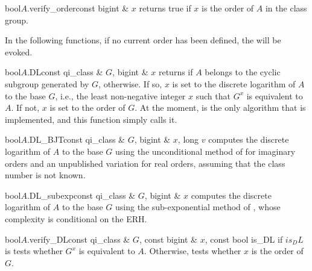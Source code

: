 \begin{cfcode}{bool}{$A$.verify_order}{const bigint & $x$}
  returns true if $x$ is the order of $A$ in the class group.
\end{cfcode}




In the following functions, if no current order has been defined, the \LEH will be evoked.

\begin{cfcode}{bool}{$A$.DL}{const qi_class & $G$, bigint & $x$}
  returns \TRUE if $A$ belongs to the cyclic subgroup generated by $G$, \FALSE otherwise.  If
  so, $x$ is set to the discrete logarithm of $A$ to the base $G$, i.e., the least non-negative
  integer $x$ such that $G^x$ is equivalent to $A$.  If not, $x$ is set to the order of $G$.  At
  the moment,  is the only algorithm that is implemented, and this function simply
  calls it.
\end{cfcode}

\begin{cfcode}{bool}{$A$.DL_BJT}{const qi_class & $G$, bigint & $x$, long $v$}
  computes the discrete logarithm of $A$ to the base $G$ using the unconditional method of
  \cite{Buchmann/Jabobson/Teske:1997} for imaginary orders and an unpublished variation for real
  orders, assuming that the class number is not known.
\end{cfcode}


\begin{cfcode}{bool}{$A$.DL_subexp}{const qi_class & $G$, bigint & $x$}
  computes the discrete logarithm of $A$ to the base $G$ using the sub-exponential method of
  \cite{Jacobson_Thesis:1999}, whose complexity is conditional on the ERH.
\end{cfcode}

\begin{cfcode}{bool}{$A$.verify_DL}{const qi_class & $G$, const bigint & $x$, const bool is_DL}
  if $is_DL$ is \TRUE tests whether $G^x$ is equivalent to $A$.  Otherwise, tests whether $x$ is
  the order of $G$.
\end{cfcode}


